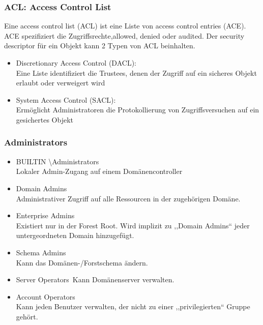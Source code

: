 \subsubsection{ACL: Access Control List}
Eine access control list (ACL) ist eine Liste von access control entries (ACE). ACE spezifiziert die Zugriffsrechte,allowed, denied oder audited. Der security descriptor für ein Objekt kann 2 Typen von ACL beinhalten.
\begin{itemize}
    \item Discretionary Access Control (DACL):\\
    Eine Liste identifiziert die Trustees, denen der Zugriff auf ein sicheres Objekt erlaubt oder verweigert wird
    \item System Access Control (SACL):\\
    Ermöglicht Administratoren die Protokollierung von Zugriffsversuchen auf ein gesichertes Objekt
\end{itemize}

\subsubsection{Administrators}
\begin{itemize}
    \item BUILTIN \textbackslash Administrators\\
    Lokaler Admin-Zugang auf einem Domänencontroller
    \item Domain Admins\\
    Administrativer Zugriff auf alle Ressourcen in der zugehörigen Domäne.
    \item Enterprise Admins\\
    Existiert nur in der Forest Root. Wird implizit zu ,,Domain Admins`` jeder untergeordneten Domain hinzugefügt.
    \item Schema Admins\\
    Kann das Domänen-/Forstschema ändern.
    \item Server Operators\
    Kann Domänenserver verwalten.
    \item Account Operators\\
    Kann jeden Benutzer verwalten, der nicht zu einer ,,privilegierten`` Gruppe gehört.
\end{itemize}

